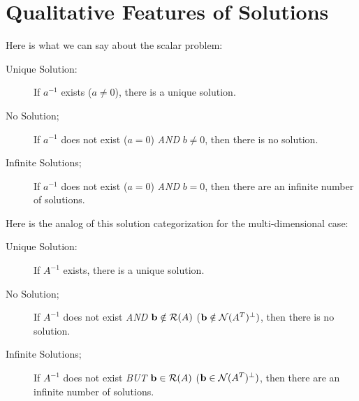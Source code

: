 \documentclass{article}
\begin{document}
\section{Qualitative Features of Solutions}
Here is what we can say about the scalar problem:
\begin{description}
\item[Unique Solution:]{If $a^{-1}$ exists ($a \ne 0$), there is
    a unique solution.}
\item[No Solution;]{If $a^{-1}$ does not exist ($a = 0$) {\em AND\/}
  $b \ne 0$, then there is no solution.}  
\item[Infinite Solutions;]{If $a^{-1}$ does not exist ($a = 0$) {\em AND\/}
  $b = 0$, then there are an infinite number of solutions.}  
\end{description}

Here is the analog of this solution categorization for the multi-dimensional case:
\begin{description}
\item[Unique Solution:]{If $A^{-1}$ exists, there is
    a unique solution.}
\item[No Solution;]{If $A^{-1}$ does not exist {\em AND\/}
    ${\bf b} \notin {\cal R}(A)$ (${\bf b} \notin {\cal N}(A^T)^\perp)$,
    then there is no solution.}  
\item[Infinite Solutions;]{If $A^{-1}$ does not exist {\em BUT\/}
    ${\bf b} \in {\cal R}(A)$ (${\bf b} \in {\cal N}(A^T)^\perp)$,
    then there are an infinite number of solutions.}  
\end{description}
\end{document}
